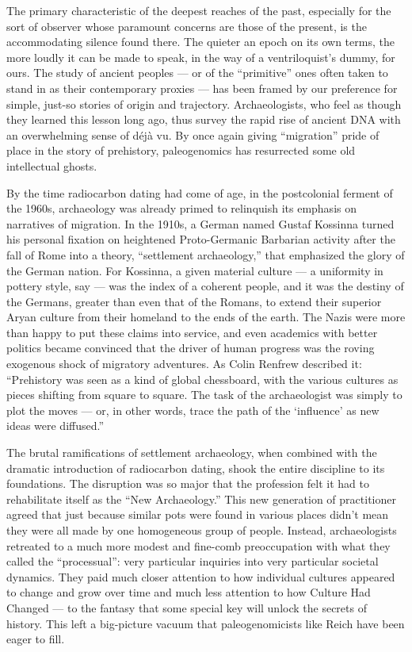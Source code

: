 The primary characteristic of the deepest reaches of the past,
especially for the sort of observer whose paramount concerns are those
of the present, is the accommodating silence found there. The quieter an
epoch on its own terms, the more loudly it can be made to speak, in the
way of a ventriloquist's dummy, for ours. The study of ancient peoples
--- or of the ``primitive'' ones often taken to stand in as their
contemporary proxies --- has been framed by our preference for simple,
just-so stories of origin and trajectory. Archaeologists, who feel as
though they learned this lesson long ago, thus survey the rapid rise of
ancient DNA with an overwhelming sense of déjà vu. By once again giving
``migration'' pride of place in the story of prehistory, paleogenomics
has resurrected some old intellectual ghosts.

By the time radiocarbon dating had come of age, in the postcolonial
ferment of the 1960s, archaeology was already primed to relinquish its
emphasis on narratives of migration. In the 1910s, a German named Gustaf
Kossinna turned his personal fixation on heightened Proto-Germanic
Barbarian activity after the fall of Rome into a theory, ``settlement
archaeology,'' that emphasized the glory of the German nation. For
Kossinna, a given material culture --- a uniformity in pottery style,
say --- was the index of a coherent people, and it was the destiny of
the Germans, greater than even that of the Romans, to extend their
superior Aryan culture from their homeland to the ends of the earth. The
Nazis were more than happy to put these claims into service, and even
academics with better politics became convinced that the driver of human
progress was the roving exogenous shock of migratory adventures. As
Colin Renfrew described it: ``Prehistory was seen as a kind of global
chessboard, with the various cultures as pieces shifting from square to
square. The task of the archaeologist was simply to plot the moves ---
or, in other words, trace the path of the `influence' as new ideas were
diffused.''

The brutal ramifications of settlement archaeology, when combined with
the dramatic introduction of radiocarbon dating, shook the entire
discipline to its foundations. The disruption was so major that the
profession felt it had to rehabilitate itself as the ``New
Archaeology.'' This new generation of practitioner agreed that just
because similar pots were found in various places didn't mean they were
all made by one homogeneous group of people. Instead, archaeologists
retreated to a much more modest and fine-comb preoccupation with what
they called the ``processual'': very particular inquiries into very
particular societal dynamics. They paid much closer attention to how
individual cultures appeared to change and grow over time and much less
attention to how Culture Had Changed --- to the fantasy that some
special key will unlock the secrets of history. This left a big-picture
vacuum that paleogenomicists like Reich have been eager to fill.

